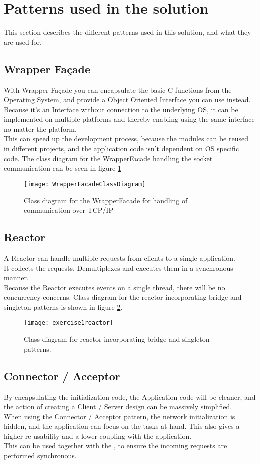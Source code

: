 \documentclass[Main]{subfiles}
\begin{document}
\section{Patterns used in the solution}\label{sec:patterns}
This section describes the different patterns used in this solution, and what they are used for.
\subsection{Wrapper Façade}
With Wrapper Façade you can encapsulate the basic C functions from the Operating System, and provide a Object Oriented Interface you can use instead.\\
Because it's an Interface without connection to the underlying OS, it can be implemented on multiple platforms and thereby enabling using the same interface no matter the platform.\\
This can speed up the development process, because the modules can be reused in different projects, and the application code isn't dependent on OS specific code. The class diagram for the WrapperFacade handling the socket communication can be seen in figure \ref{fig:wrapperfacadeuml}

\begin{figure}[hbtp]
\centering
\texttt{[image: WrapperFacadeClassDiagram]}
\caption{Class diagram for the WrapperFacade for handling of communication over TCP/IP}
\label{fig:wrapperfacadeuml}
\end{figure}


\subsection{Reactor}
A Reactor can handle multiple requests from clients to a single application.\\
It collects the requests, Demultiplexes and executes them in a synchronous manner.\\
Because the Reactor executes events on a single thread, there will be no concurrency concerns. Class diagram for the reactor incorporating bridge and singleton patterns is shown in figure \ref{fig:reactoruml}.

\begin{figure}[hbtp]
\centering
\texttt{[image: exercise1reactor]}
\caption{Class diagram for reactor incorporating bridge and singleton patterns.}
\label{fig:reactoruml}
\end{figure}

\subsection{Connector / Acceptor}
By encapsulating the initialization code, the Application code will be cleaner, and the action of creating a Client / Server design can be massively simplified.\\
When using the Connector / Acceptor pattern, the network initialization is hidden, and the application can focus on the tasks at hand.
This also gives a higher re usability and a lower coupling with the application.\\
This can be used together with the , to ensure the incoming requests are performed synchronous. 
\end{document}
